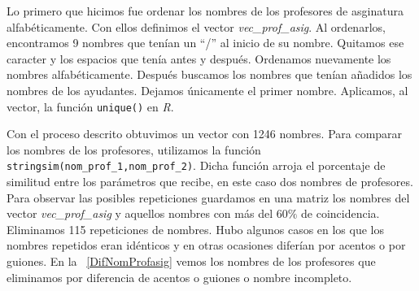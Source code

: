 Lo primero que hicimos fue ordenar los nombres de los profesores de asginatura alfabéticamente. Con ellos definimos el vector \textit{vec\_prof\_asig}. Al ordenarlos, encontramos 9 nombres que tenían un ``/'' al inicio de su nombre. Quitamos ese caracter y los espacios que tenía antes y después. Ordenamos nuevamente los nombres alfabéticamente. Después buscamos los nombres que tenían añadidos los nombres de los ayudantes. Dejamos únicamente el primer nombre. Aplicamos, al vector, la función \verb+unique()+ en \textit{R}.

Con el proceso descrito obtuvimos un vector con 1246 nombres. Para comparar los nombres de los profesores, utilizamos la función \verb+stringsim(nom_prof_1,nom_prof_2)+. Dicha función arroja el porcentaje de similitud entre los parámetros que recibe, en este caso dos nombres de profesores. Para observar las posibles repeticiones guardamos en una matriz los nombres del vector \textit{vec\_prof\_asig} y aquellos nombres con más del $60\%$ de coincidencia. Eliminamos 115 repeticiones de nombres. Hubo algunos casos en los que los nombres repetidos eran idénticos y en otras ocasiones diferían por acentos o por guiones. En la \tablename{~\ref{DifNomProfasig}} vemos los nombres de los profesores que eliminamos por diferencia de acentos o guiones o nombre incompleto.

